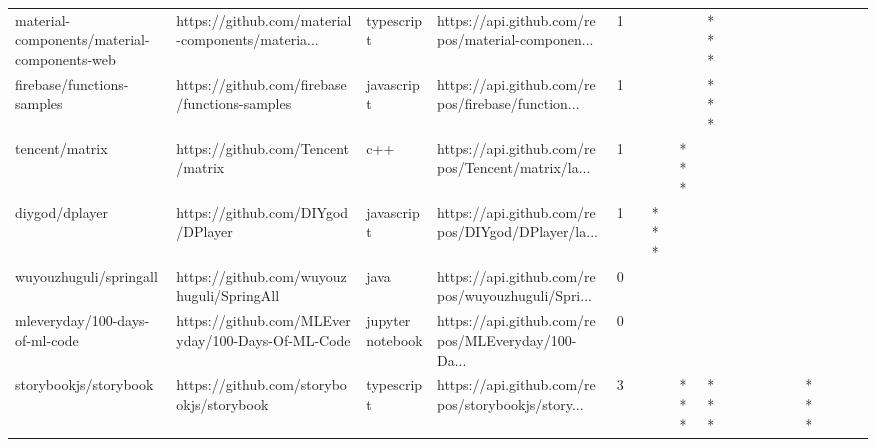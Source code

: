 \begin{tabular}{llllrlllllllllllll}
material-components/material-components-web        &  https://github.com/material-components/materia... &        typescript &  https://api.github.com/repos/material-componen... &       1 &         &        &           &            *** &                 &        &           &           &          &          &       &              &          \\
firebase/functions-samples                         &      https://github.com/firebase/functions-samples &        javascript &  https://api.github.com/repos/firebase/function... &       1 &         &        &           &            *** &                 &        &           &           &          &          &       &              &          \\
tencent/matrix                                     &                  https://github.com/Tencent/matrix &               c++ &  https://api.github.com/repos/Tencent/matrix/la... &       1 &         &        &       *** &                &                 &        &           &           &          &          &       &              &          \\
diygod/dplayer                                     &                  https://github.com/DIYgod/DPlayer &        javascript &  https://api.github.com/repos/DIYgod/DPlayer/la... &       1 &         &    *** &           &                &                 &        &           &           &          &          &       &              &          \\
wuyouzhuguli/springall                             &          https://github.com/wuyouzhuguli/SpringAll &              java &  https://api.github.com/repos/wuyouzhuguli/Spri... &       0 &         &        &           &                &                 &        &           &           &          &          &       &              &          \\
mleveryday/100-days-of-ml-code                     &  https://github.com/MLEveryday/100-Days-Of-ML-Code &  jupyter notebook &  https://api.github.com/repos/MLEveryday/100-Da... &       0 &         &        &           &                &                 &        &           &           &          &          &       &              &          \\
storybookjs/storybook                              &           https://github.com/storybookjs/storybook &        typescript &  https://api.github.com/repos/storybookjs/story... &       3 &         &        &       *** &            *** &                 &        &           &           &          &      *** &       &              &          \\

\end{tabular}
